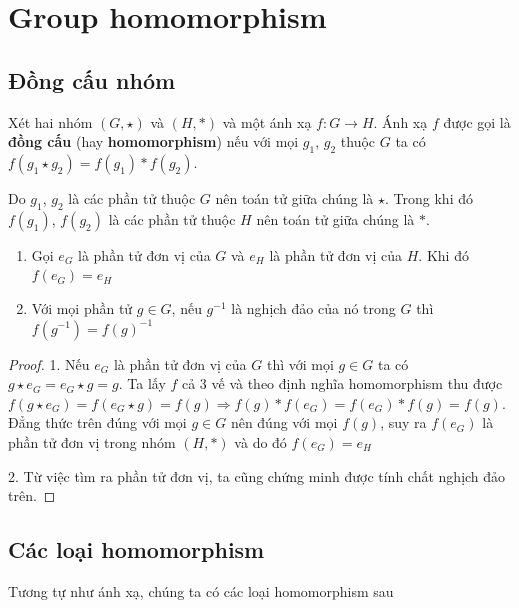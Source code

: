 \section{Group homomorphism}

\subsection*{Đồng cấu nhóm}

\begin{definition}
    Xét hai nhóm $(G, \star)$ và $(H, *)$ và một ánh xạ $f: G \to H$.
    Ánh xạ $f$ được gọi là \textbf{đồng cấu} (hay \textbf{homomorphism}) nếu với mọi $g_1$, $g_2$ thuộc $G$ ta có $f(g_1 \star g_2) = f(g_1) * f(g_2)$.
\end{definition}

Do $g_1$, $g_2$ là các phần tử thuộc $G$ nên toán tử giữa chúng là $\star$. Trong khi đó $f(g_1)$, $f(g_2)$ là các phần tử thuộc $H$ nên toán tử giữa chúng là $*$.

\begin{remark}
    \begin{enumerate}
        \item Gọi $e_G$ là phần tử đơn vị của $G$ và $e_H$ là phần tử đơn
        vị của $H$. Khi đó $f(e_G) = e_H$
        \item Với mọi phần tử $g \in G$, nếu $g^{-1}$ là nghịch đảo của nó trong $G$ thì $f(g^{-1}) = f(g)^{-1}$
    \end{enumerate}
\end{remark}

\begin{proof}
    1. Nếu $e_G$ là phần tử đơn vị của $G$ thì với mọi $g \in G$ ta có $g \star e_G = e_G \star g = g$. Ta lấy $f$ cả 3 vế và theo định nghĩa homomorphism thu được $f(g \star e_G) = f(e_G \star g) = f(g) \Rightarrow f(g) * f(e_G) = f(e_G) * f(g) = f(g)$. Đẳng thức trên đúng với mọi $g \in G$ nên đúng với mọi $f(g)$, suy ra $f(e_G)$ là phần tử đơn vị trong nhóm $(H, *)$ và do đó $f(e_G) = e_H$
    
    2. Từ việc tìm ra phần tử đơn vị, ta cũng chứng minh được tính chất nghịch đảo trên.
\end{proof}

\subsection*{Các loại homomorphism}

Tương tự như ánh xạ, chúng ta có các loại homomorphism sau

